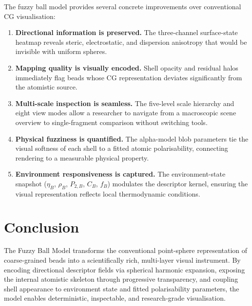 \documentclass[12pt, a4paper, oneside]{article}
\begin{document}
The fuzzy ball model provides several concrete improvements over
conventional CG visualisation:

\begin{enumerate}
  \item \textbf{Directional information is preserved.}  The three-channel
        surface-state heatmap reveals steric, electrostatic, and dispersion
        anisotropy that would be invisible with uniform spheres.

  \item \textbf{Mapping quality is visually encoded.}  Shell opacity
        and residual halos immediately flag beads whose CG representation
        deviates significantly from the atomistic source.

  \item \textbf{Multi-scale inspection is seamless.}  The five-level
        scale hierarchy and eight view modes allow a researcher to
        navigate from a macroscopic scene overview to single-fragment
        comparison without switching tools.

  \item \textbf{Physical fuzziness is quantified.}  The alpha-model
        blob parameters tie the visual softness of each shell to a
        fitted atomic polarisability, connecting rendering to a
        measurable physical property.

  \item \textbf{Environment responsiveness is captured.}  The
        environment-state snapshot ($\eta_B$, $\rho_B$, $P_{2,B}$,
        $C_B$, $f_B$) modulates the descriptor kernel, ensuring the
        visual representation reflects local thermodynamic conditions.
\end{enumerate}

\section{Conclusion}

The Fuzzy Ball Model transforms the conventional point-sphere
representation of coarse-grained beads into a scientifically rich,
multi-layer visual instrument.  By encoding directional descriptor
fields via spherical harmonic expansion, exposing the internal
atomistic skeleton through progressive transparency, and coupling
shell appearance to environment state and fitted polarisability
parameters, the model enables deterministic, inspectable, and
research-grade visualisation.
\end{document}
